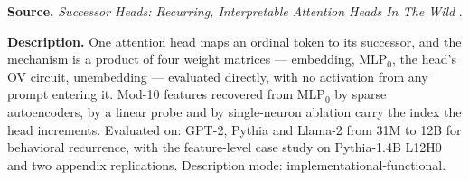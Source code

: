
\textbf{Source.} \emph{Successor Heads: Recurring, Interpretable Attention Heads In The Wild} \citep{gould2023successor}.

\textbf{Description.} One attention head maps an ordinal token to its successor, and the mechanism is a product of four weight matrices --- embedding, $\mathrm{MLP}_0$, the head's OV circuit, unembedding --- evaluated directly, with no activation from any prompt entering it. Mod-10 features recovered from $\mathrm{MLP}_0$ by sparse autoencoders, by a linear probe and by single-neuron ablation carry the index the head increments. Evaluated on: GPT-2, Pythia and Llama-2 from 31M to 12B for behavioral recurrence, with the feature-level case study on Pythia-1.4B L12H0 and two appendix replications. Description mode: implementational-functional.

